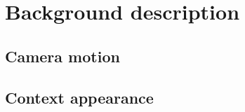\section{Background description}
\label{scene}
\subsection{Camera motion}
\subsection{Context appearance}
